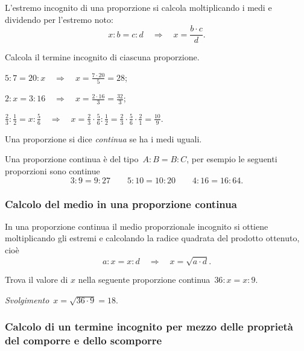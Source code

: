L'estremo incognito di una proporzione si calcola moltiplicando i medi e dividendo per l'estremo noto:
\[x:b=c:d\quad\Rightarrow\quad x=\frac{b\cdot c}{d}.\]

\begin{exrig} %
\begin{esempio}
Calcola il termine incognito di ciascuna proporzione.
\vspace{-1.3ex}\begin{itemize*}
  \item $5:7=20:x\quad\Rightarrow\quad x=\frac{7\cdot 20}{5}=28$;
  \item $2:x=3:16\quad\Rightarrow\quad x=\frac{2\cdot 16}{3}=\frac{32}{3}$;
  \item $\frac{2}{3}:\frac{1}{2}=x:\frac{5}{6}%
\quad\Rightarrow\quad x=\frac{2}{3}\cdot\frac{5}{6}:\frac{1}{2}=\frac{2}{3}%
\cdot\frac{5}{6}\cdot\frac{2}{1}=\frac{10}{9}$.
\end{itemize*}
\end{esempio}%
\end{exrig}

\begin{definizione}
  Una proporzione si dice \emph{continua} se ha i medi uguali.
\end{definizione}

Una proporzione continua è del tipo~$A:B=B:C$, per esempio le seguenti proporzioni sono continue
\[3:9=9:27\qquad5:10=10:20\qquad4:16=16:64.\]

\subsubsection*{Calcolo del medio in una proporzione continua}

In una proporzione continua il medio proporzionale incognito si ottiene moltiplicando gli estremi
e calcolando la radice quadrata del prodotto ottenuto, cioè
\[a:x=x:d\quad\Rightarrow\quad x=\sqrt{a\cdot d}.\]

\begin{exrig}
\begin{esempio}
Trova il valore di $x$ nella seguente proporzione continua~$36:x=x:9$.

\emph{Svolgimento}~$x=\sqrt{36\cdot 9}=18$.
\end{esempio}
\end{exrig}

\subsubsection*{Calcolo di un termine incognito per mezzo delle proprietà del comporre e dello scomporre}

